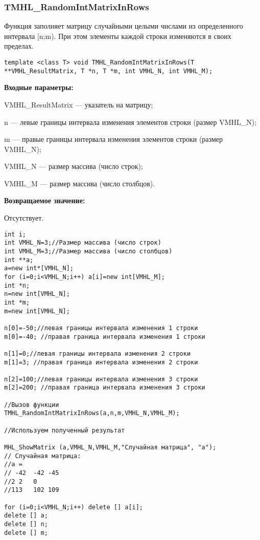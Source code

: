\documentclass[a4paper,12pt]{article}
\begin{document}
\subsubsection{TMHL\_RandomIntMatrixInRows}\label{TMHL_RandomIntMatrixInRows}

Функция заполняет матрицу случайными целыми числами из определенного интервала [n;m). При этом элементы каждой строки изменяются в своих пределах.


\begin{lstlisting}[label=code_syntax_TMHL_RandomIntMatrixInRows,caption=Синтаксис]
template <class T> void TMHL_RandomIntMatrixInRows(T **VMHL_ResultMatrix, T *n, T *m, int VMHL_N, int VMHL_M);
\end{lstlisting}

\textbf{Входные параметры:}
 
VMHL\_ResultMatrix --- указатель на матрицу;
 
n --- левые границы интервала изменения элементов строки (размер VMHL\_N);
 
m --- правые границы интервала изменения элементов строки (размер VMHL\_N);
 
VMHL\_N --- размер массива (число строк);
 
VMHL\_M --- размер массива (число столбцов).

\textbf{Возвращаемое значение:}

Отсутствует.


\begin{lstlisting}[label=code_use_TMHL_RandomIntMatrixInRows,caption=Пример использования]
int i;
int VMHL_N=3;//Размер массива (число строк)
int VMHL_M=3;//Размер массива (число столбцов)
int **a;
a=new int*[VMHL_N];
for (i=0;i<VMHL_N;i++) a[i]=new int[VMHL_M];
int *n;
n=new int[VMHL_N];
int *m;
m=new int[VMHL_N];

n[0]=-50;//левая границы интервала изменения 1 строки
m[0]=-40; //правая граница интервала изменения 1 строки

n[1]=0;//левая границы интервала изменения 2 строки
m[1]=3; //правая граница интервала изменения 2 строки

n[2]=100;//левая границы интервала изменения 3 строки
m[2]=200; //правая граница интервала изменения 3 строки

//Вызов функции
TMHL_RandomIntMatrixInRows(a,n,m,VMHL_N,VMHL_M);

//Используем полученный результат

MHL_ShowMatrix (a,VMHL_N,VMHL_M,"Случайная матрица", "a");
// Случайная матрица:
//a =
// -42	-42	-45
//2	2	0
//113	102	109

for (i=0;i<VMHL_N;i++) delete [] a[i];
delete [] a;
delete [] n;
delete [] m;
\end{lstlisting}
\end{document}
